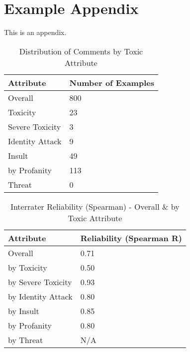 \documentclass[11pt]{article}
\begin{document}






\appendix

\section{Example Appendix}
\label{sec:appendix}

This is an appendix.
\begin{table*}
\centering
\begin{tabular}{ll}
\hline
Attribute       & Number of Examples \\ \hline
Overall         & 800                \\ \hline
Toxicity        & 23                 \\
Severe Toxicity & 3                  \\
Identity Attack & 9                  \\
Insult          & 49                 \\
by Profanity    & 113                \\
Threat          & 0                  \\ \hline
\end{tabular}
\caption{\label{data-distribution}
Distribution of Comments by Toxic Attribute  }
\end{table*}
\begin{table*}
\centering
\begin{tabular}{ll}
\hline
Attribute          & Reliability (Spearman R) \\ \hline
Overall            & 0.71                     \\ \hline
by Toxicity        & 0.50                     \\
by Severe Toxicity & 0.93                     \\
by Identity Attack & 0.80                     \\
by Insult          & 0.85                     \\
by Profanity       & 0.80                     \\
by Threat          & N/A                      \\ \hline
\end{tabular}
\caption{\label{interrater-summary}
Interrater Reliability (Spearman) - Overall \& by Toxic Attribute }
\end{table*}
\end{document}
